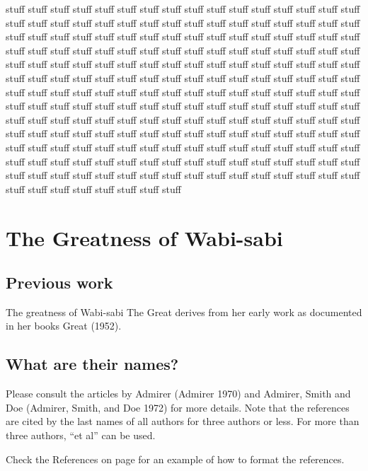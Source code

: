 \documentclass[
  dissertation]{bsu-cs}
\begin{document}
stuff stuff stuff stuff stuff stuff stuff stuff stuff stuff stuff stuff
stuff stuff stuff stuff stuff stuff stuff stuff stuff stuff stuff stuff
stuff stuff stuff stuff stuff stuff stuff stuff stuff stuff stuff stuff
stuff stuff stuff stuff stuff stuff stuff stuff stuff stuff stuff stuff
stuff stuff stuff stuff stuff stuff stuff stuff stuff stuff stuff stuff
stuff stuff stuff stuff stuff stuff stuff stuff stuff stuff stuff stuff
stuff stuff stuff stuff stuff stuff stuff stuff stuff stuff stuff stuff
stuff stuff stuff stuff stuff stuff stuff stuff stuff stuff stuff stuff
stuff stuff stuff stuff stuff stuff stuff stuff stuff stuff stuff stuff
stuff stuff stuff stuff stuff stuff stuff stuff stuff stuff stuff stuff
stuff stuff stuff stuff stuff stuff stuff stuff stuff stuff stuff stuff
stuff stuff stuff stuff stuff stuff stuff stuff stuff stuff stuff stuff
stuff stuff stuff stuff stuff stuff stuff stuff stuff stuff stuff stuff
stuff stuff stuff stuff stuff stuff stuff stuff stuff stuff stuff stuff
stuff stuff stuff stuff stuff stuff stuff stuff stuff stuff stuff stuff
stuff stuff stuff stuff stuff stuff stuff stuff stuff stuff stuff stuff
stuff stuff stuff stuff stuff stuff stuff stuff stuff stuff stuff stuff
stuff stuff stuff stuff stuff stuff stuff stuff stuff stuff stuff stuff

\chapter{The Greatness of Wabi-sabi} \label{ch-wabisabiGreatness}

\section{Previous work}\label{previous-work}

The greatness of Wabi-sabi The Great derives from her early work as
documented in her books Great (1952).

\section{What are their names?}\label{what-are-their-names}

Please consult the articles by Admirer (Admirer 1970) and Admirer, Smith
and Doe (Admirer, Smith, and Doe 1972) for more details. Note that the
references are cited by the last names of all authors for three authors
or less. For more than three authors, ``et al'' can be used.

Check the References on page \pageref{refs} for an example of how to
format the references.
\end{document}
